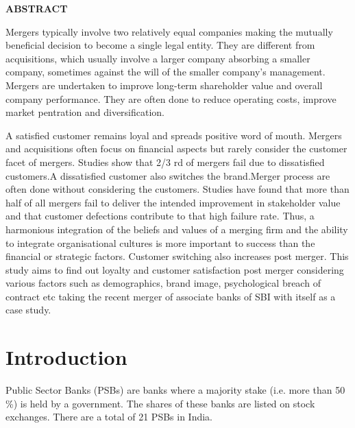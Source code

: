 \documentclass[a4paper, 12pt]{extarticle}
\begin{document}
{%
\newpage
\begin{center}
\textbf{\fontsize{14}{2} \selectfont ABSTRACT}\\
\end{center}
\par Mergers typically involve two relatively equal companies making the mutually beneficial decision to become a single legal entity. They are different from acquisitions, which usually involve a larger company absorbing a smaller company, sometimes against the will of the smaller company's management. Mergers are undertaken to improve long-term shareholder value and overall company performance. They are often done to reduce operating costs, improve market pentration and diversification.
\par A satisfied customer remains loyal and spreads positive word of mouth. Mergers and acquisitions often focus on financial aspects but rarely consider the customer facet of mergers. Studies show that 2/3 rd of mergers fail due to dissatisfied customers.A dissatisfied customer also switches the brand.Merger process are often done without considering the customers. Studies have found that more than half of all mergers fail to deliver the intended improvement in stakeholder value and that customer defections contribute to that high failure rate. Thus, a harmonious integration of the beliefs and values of a merging firm and the ability to integrate organisational cultures is more important to success than the financial or strategic factors. Customer switching also increases post merger. This study aims to find out loyalty and customer satisfaction post merger considering various factors such as demographics, brand image, psychological breach of contract etc taking the recent merger of associate banks of SBI with itself as a case study.

\newpage

\tableofcontents
\listoffigures
\listoftables

\newpage
{}
\section{Introduction}
\par Public Sector Banks (PSBs) are banks where a majority stake (i.e. more than 50 \%) is held by a government. The shares of these banks are listed on stock exchanges. There are a total of 21 PSBs in India.

}
\end{document}
